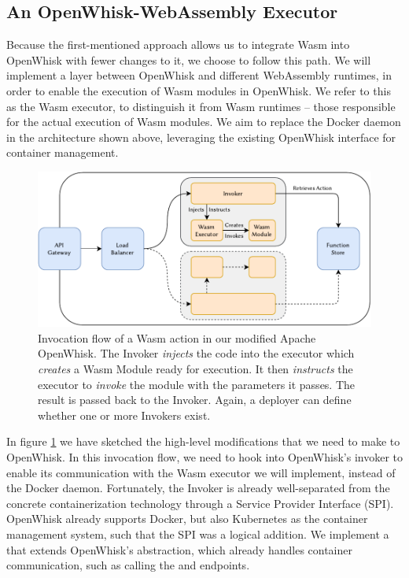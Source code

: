 \subsection{An OpenWhisk-WebAssembly Executor}

Because the first-mentioned approach allows us to integrate Wasm into OpenWhisk with fewer changes to it, we choose to follow this path. We will implement a layer between OpenWhisk and different WebAssembly runtimes, in order to enable the execution of Wasm modules in OpenWhisk. We refer to this as the Wasm executor, to distinguish it from Wasm runtimes -- those responsible for the actual execution of Wasm modules. We aim to replace the Docker daemon in the architecture shown above, leveraging the existing OpenWhisk interface for container management.

\begin{figure}
    \includegraphics{figures/WasmOpenWhiskActionInvocationFlow.pdf}
    \caption{Invocation flow of a Wasm action in our modified Apache OpenWhisk. The Invoker \emph{injects} the code into the executor which \emph{creates} a Wasm Module ready for execution. It then \emph{instructs} the executor to \emph{invoke} the module with the parameters it passes. The result is passed back to the Invoker. Again, a deployer can define whether one or more Invokers exist.}
    \label{fig:wasm-openwhisk-action-invocation-flow}
\end{figure}

In figure \ref{fig:wasm-openwhisk-action-invocation-flow} we have sketched the high-level modifications that we need to make to OpenWhisk. In this invocation flow, we need to hook into OpenWhisk's invoker to enable its communication with the Wasm executor we will implement, instead of the Docker daemon. Fortunately, the Invoker is already well-separated from the concrete containerization technology through a Service Provider Interface (SPI). OpenWhisk already supports Docker, but also Kubernetes as the container management system, such that the SPI was a logical addition. We implement a  that extends OpenWhisk's  abstraction, which already handles container communication, such as calling the  and  endpoints.

